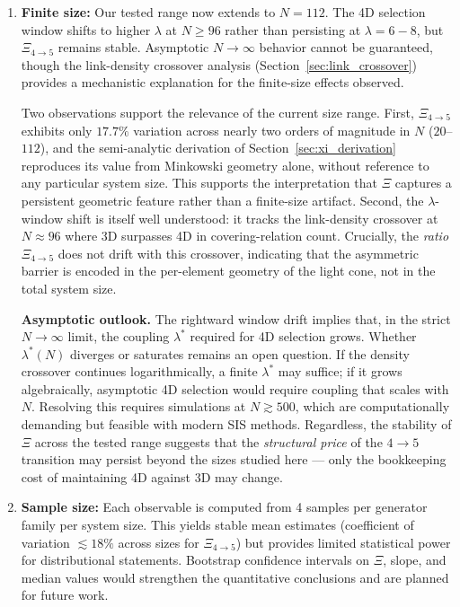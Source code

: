 \documentclass[12pt,a4paper]{article}
\begin{document}
\begin{enumerate}
  \item \textbf{Finite size:} Our tested range now extends to $N = 112$.
    The 4D selection window shifts to higher $\lambda$ at $N \geq 96$ rather than
    persisting at $\lambda = 6{-}8$, but $\Xi_{4 \to 5}$ remains stable.
    Asymptotic $N \to \infty$ behavior cannot be guaranteed,
    though the link-density crossover analysis (Section~\ref{sec:link_crossover})
    provides a mechanistic explanation for the finite-size effects observed.

    Two observations support the relevance of the current size range.
    First, $\Xi_{4 \to 5}$ exhibits only $17.7\%$ variation across nearly two
    orders of magnitude in $N$ ($20$--$112$), and the semi-analytic
    derivation of Section~\ref{sec:xi_derivation} reproduces its value
    from Minkowski geometry alone, without reference to any particular system
    size.  This supports the interpretation that $\Xi$ captures a persistent geometric
    feature rather than a finite-size artifact.
    Second, the $\lambda$-window shift is itself well understood: it tracks
    the link-density crossover at $N \approx 96$ where 3D surpasses 4D
    in covering-relation count.  Crucially, the \emph{ratio} $\Xi_{4 \to 5}$
    does not drift with this crossover, indicating that the asymmetric
    barrier is encoded in the per-element geometry of the light cone,
    not in the total system size.

    \textbf{Asymptotic outlook.}
    The rightward window drift implies that, in the strict $N \to \infty$
    limit, the coupling $\lambda^*$ required for 4D selection grows.
    Whether $\lambda^*(N)$ diverges or saturates remains an open question.
    If the density crossover continues logarithmically, a finite $\lambda^*$
    may suffice; if it grows algebraically, asymptotic 4D selection would
    require coupling that scales with $N$.  Resolving this requires simulations
    at $N \gtrsim 500$, which are computationally demanding but feasible
    with modern SIS methods.  Regardless, the stability of $\Xi$ across
    the tested range suggests that the \emph{structural price} of the $4{\to}5$ transition
    may persist beyond the sizes studied here --- only the bookkeeping cost of maintaining 4D
    against 3D may change.

  \item \textbf{Sample size:} Each observable is computed from 4 samples per
    generator family per system size.  This yields stable mean estimates
    (coefficient of variation $\lesssim 18\%$ across sizes for $\Xi_{4\to5}$)
    but provides limited statistical power for distributional statements.
    Bootstrap confidence intervals on $\Xi$, slope, and median values would
    strengthen the quantitative conclusions and are planned for future work.


\end{enumerate}
\end{document}
